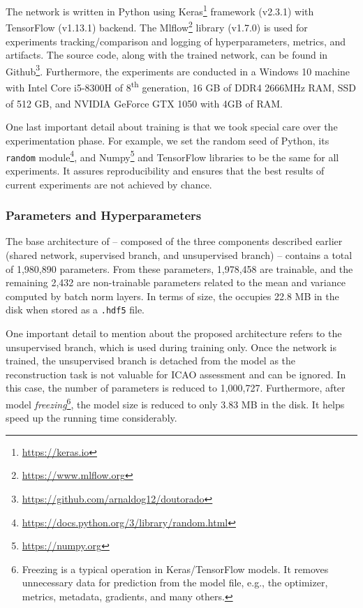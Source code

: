 The network is written in Python using Keras\footnote{\url{https://keras.io}} framework (v2.3.1) with TensorFlow (v1.13.1) backend. The Mlflow\footnote{\url{https://www.mlflow.org}} library (v1.7.0) is used for experiments tracking/comparison and logging of hyperparameters, metrics, and artifacts. The source code, along with the trained network, can be found in Github\footnote{\url{https://github.com/arnaldog12/doutorado}}. Furthermore, the experiments are conducted in a Windows 10 machine with Intel\textsuperscript{\tiny\textregistered} Core\textsuperscript{\tiny\texttrademark} i5-8300H of 8\textsuperscript{th} generation, 16 GB of DDR4 2666MHz RAM, SSD of 512 GB, and NVIDIA\textsuperscript{\tiny\textregistered} GeForce\textsuperscript{\tiny\textregistered} GTX 1050 with 4GB of RAM.

One last important detail about \methodname training is that we took special care over the experimentation phase. For example, we set the random seed of Python, its \texttt{random} module\footnote{\url{https://docs.python.org/3/library/random.html}}, and Numpy\footnote{\url{https://numpy.org}} and TensorFlow libraries to be the same for all experiments. It assures reproducibility and ensures that the best results of current experiments are not achieved by chance.

\subsubsection{Parameters and Hyperparameters} \label{sec:hyperparams}

The base architecture of \methodname -- composed of the three components described earlier (shared network, supervised branch, and unsupervised branch) -- contains a total of 1,980,890 parameters. From these parameters, 1,978,458 are trainable, and the remaining 2,432 are non-trainable parameters related to the mean and variance computed by batch norm layers. In terms of size, the \methodname occupies 22.8 MB in the disk when stored as a \texttt{.hdf5} file.

One important detail to mention about the proposed architecture refers to the unsupervised branch, which is used during training only. Once the network is trained, the unsupervised branch is detached from the model as the reconstruction task is not valuable for ICAO assessment and can be ignored. In this case, the number of parameters is reduced to 1,000,727. Furthermore, after model \textit{freezing}\footnote{Freezing is a typical operation in Keras/TensorFlow models. It removes unnecessary data for prediction from the model file, e.g., the optimizer, metrics, metadata, gradients, and many others.}, the model size is reduced to only 3.83 MB in the disk. It helps speed up the running time considerably.

